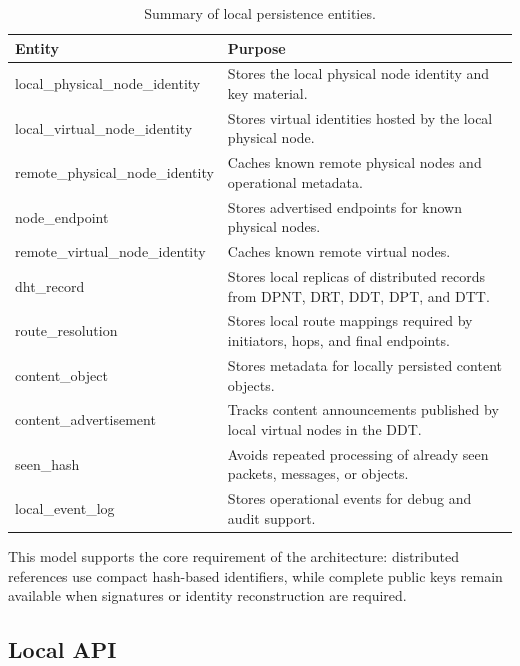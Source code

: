 \documentclass[12pt]{article}
\newcommand{\codebreak}[1]{{\footnotesize\ttfamily #1}}
\begin{document}
\begin{table}[H]
\centering
\caption{Summary of local persistence entities.}
\label{tab:persistence-summary}
\begin{tabularx}{\textwidth}{L{0.27\textwidth} Y}
\toprule
\textbf{Entity} & \textbf{Purpose} \\
\midrule
\codebreak{local\_\allowbreak{}physical\_\allowbreak{}node\_\allowbreak{}identity} & Stores the local physical node identity and key material. \\
\codebreak{local\_\allowbreak{}virtual\_\allowbreak{}node\_\allowbreak{}identity} & Stores virtual identities hosted by the local physical node. \\
\codebreak{remote\_\allowbreak{}physical\_\allowbreak{}node\_\allowbreak{}identity} & Caches known remote physical nodes and operational metadata. \\
\codebreak{node\_\allowbreak{}endpoint} & Stores advertised endpoints for known physical nodes. \\
\codebreak{remote\_\allowbreak{}virtual\_\allowbreak{}node\_\allowbreak{}identity} & Caches known remote virtual nodes. \\
\codebreak{dht\_\allowbreak{}record} & Stores local replicas of distributed records from DPNT, DRT, DDT, DPT, and DTT. \\
\codebreak{route\_\allowbreak{}resolution} & Stores local route mappings required by initiators, hops, and final endpoints. \\
\codebreak{content\_\allowbreak{}object} & Stores metadata for locally persisted content objects. \\
\codebreak{content\_\allowbreak{}advertisement} & Tracks content announcements published by local virtual nodes in the DDT. \\
\codebreak{seen\_\allowbreak{}hash} & Avoids repeated processing of already seen packets, messages, or objects. \\
\codebreak{local\_\allowbreak{}event\_\allowbreak{}log} & Stores operational events for debug and audit support. \\
\bottomrule
\end{tabularx}
\end{table}

This model supports the core requirement of the architecture: distributed references use compact hash-based identifiers, while complete public keys remain available when signatures or identity reconstruction are required.

\subsection{Local API}
\label{sec:local-api-implementation}
\end{document}
